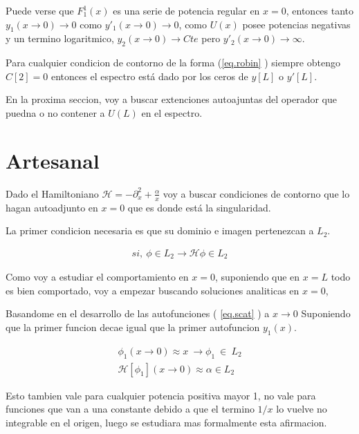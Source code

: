 Puede verse que $F _1 ^1 (x)$ es una serie de potencia regular en $x=0$, entonces tanto  $y_1 (x \rightarrow 0 ) \rightarrow 0$ como $y' _1 (x \rightarrow 0 ) \rightarrow 0$, como $U(x)$ posee potencias negativas y un termino logaritmico, $y _2 (x \rightarrow 0 ) \rightarrow Cte$ pero  $y' _2 (x \rightarrow 0 ) \rightarrow \infty $.

Para cualquier condicion de contorno de la forma (\ref{eq.robin} ) siempre obtengo $C[2] = 0$ entonces el espectro está dado por los ceros de $y[L]$ o $y'[L]$.


En la proxima seccion, voy a buscar extenciones autoajuntas del operador que puedna o no contener a $U(L)$ en el espectro.


\section{Artesanal}

Dado el Hamiltoniano $\mathscr{H} = - \partial ^2 _x + \frac{\alpha}{x}  $ voy a buscar condiciones de contorno que lo hagan autoadjunto en $x=0$ que es donde está la singularidad. 

La primer condicion necesaria es que su dominio e imagen pertenezcan a $L _2$.

\begin{equation}
\begin{array}{c}
si, \ \phi \in L _2 \rightarrow \mathscr{H} \phi \in L _2
\end{array}
\end{equation}


Como voy a estudiar el comportamiento en $x=0$, suponiendo que en $x=L$ todo es bien comportado, voy a empezar buscando soluciones analiticas en $x=0$, 

Basandome en el desarrollo de las autofunciones ( \ref{eq.scat} ) a  $x \rightarrow 0 $ 
Suponiendo que la primer funcion decae igual que la primer autofuncion $ y_1 (x) $.

\begin{equation}
\begin{array}{c}
\phi _1 (x \rightarrow 0) \approx x \ \rightarrow \phi _1 \ \in \ L _2 \\
\mathscr{H} [ \phi _1 ] (x \rightarrow 0) \approx \alpha \in L _2
\end{array}
\label{eq.chico1}
\end{equation}

Esto tambien vale para cualquier potencia positiva mayor 1, no vale para funciones que van a una constante debido a que el termino $1/x$ lo vuelve no integrable en el origen, luego se estudiara mas formalmente esta afirmacion.

